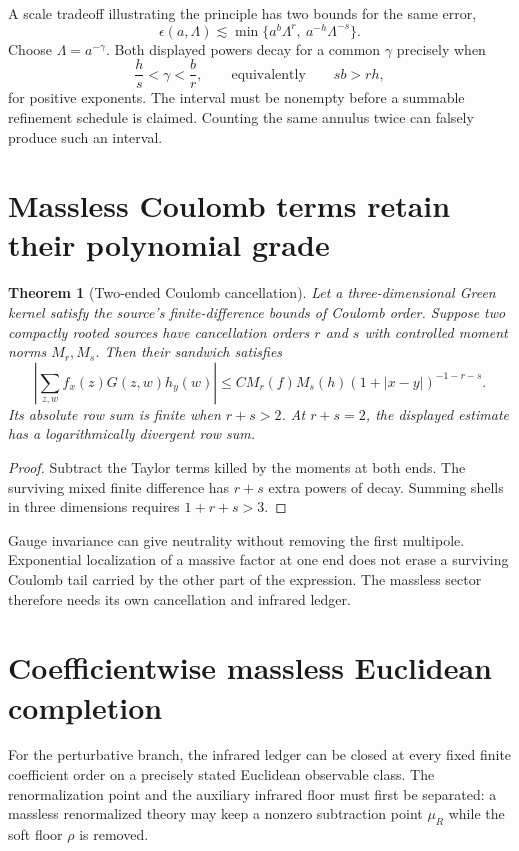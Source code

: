 \documentclass[11pt,a4paper,oneside]{book}
\theoremstyle{plain}
\newtheorem{theorem}{Theorem}[chapter]
\theoremstyle{definition}
\theoremstyle{remark}
\newcommand{\abs}[1]{\left\lvert#1\right\rvert}
\newcommand{\src}[2]{\cite{#1}}
\begin{document}
A scale tradeoff illustrating the principle has two bounds for the same error,
\begin{equation}
 \epsilon(a,\Lambda)\lesssim
 \min\{a^b\Lambda^r,\ a^{-h}\Lambda^{-s}\}.
 \label{eq:two-regime}
\end{equation}
Choose $\Lambda=a^{-\gamma}$. Both displayed powers decay for a common $\gamma$ precisely when
\begin{equation}
 \frac hs<\gamma<\frac br,
 \qquad\text{equivalently}\qquad sb>rh,
 \label{eq:scale-window}
\end{equation}
for positive exponents. The interval must be nonempty before a summable refinement schedule is claimed. Counting the same annulus twice can falsely produce such an interval. \cite{R5,R6}

\section{Massless Coulomb terms retain their polynomial grade}
\begin{theorem}[Two-ended Coulomb cancellation]
\label{thm:coulomb}
Let a three-dimensional Green kernel satisfy the source's finite-difference bounds of Coulomb order. Suppose two compactly rooted sources have cancellation orders $r$ and $s$ with controlled moment norms $M_r,M_s$. Then their sandwich satisfies
\begin{equation}
 \abs{\sum_{z,w}f_x(z)G(z,w)h_y(w)}
 \le C M_r(f)M_s(h)(1+|x-y|)^{-1-r-s}.
 \label{eq:coulomb}
\end{equation}
Its absolute row sum is finite when $r+s>2$. At $r+s=2$, the displayed estimate has a logarithmically divergent row sum.
\end{theorem}
\begin{proof}
Subtract the Taylor terms killed by the moments at both ends. The surviving mixed finite difference has $r+s$ extra powers of decay. Summing shells in three dimensions requires $1+r+s>3$.
\end{proof}
\src{R5}{thm:v5v91-two-ended}
Gauge invariance can give neutrality without removing the first multipole. Exponential localization of a massive factor at one end does not erase a surviving Coulomb tail carried by the other part of the expression. The massless sector therefore needs its own cancellation and infrared ledger.

\section{Coefficientwise massless Euclidean completion}
\label{sec:perturbative-ir}
For the perturbative branch, the infrared ledger can be closed at every fixed
finite coefficient order on a precisely stated Euclidean observable class.
The renormalization point and the auxiliary infrared floor must first be
separated: a massless renormalized theory may keep a nonzero subtraction point
$\mu_R$ while the soft floor $\rho$ is removed.
\end{document}
